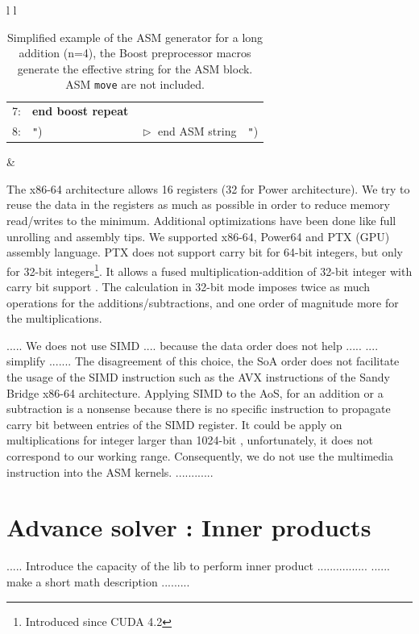 \documentclass[oribibl]{llncs2e/llncs}
\begin{document}
\begin{table}[h]
\begin{center}
\begin{tabular}{l l}
\begin{tabular}{l l l l }
                               \tiny{7:} &  \textbf{end boost repeat} &  &   \\                            
                               \tiny{8:} &  \texttt{"})  &  $\vartriangleright$ end ASM string & \texttt{"})\\
                          \end{tabular} &  \\ \hline
		 \end{tabular} 
		 \caption{Simplified  example of the ASM generator for a long addition (n=4), the Boost preprocessor macros generate the effective string for the ASM block. ASM \texttt{move} are not included. \label{ASMGENERATOR}  }
	\end{center}
\end{table} 

The x86-64 architecture allows 16 registers (32 for Power architecture). We try to reuse the data in the registers as much as possible in order to reduce memory read/writes to the minimum.  Additional optimizations have been done like full unrolling and assembly tips. We  supported  x86-64, Power64 and PTX (GPU) assembly language. PTX does not support carry bit for 64-bit integers, but only for 32-bit integers\footnote{Introduced since CUDA 4.2}.  
It allows a fused multiplication-addition of 32-bit integer  with carry bit support \cite{CUDAasm}.  The calculation in 32-bit mode imposes twice as much operations for the additions/subtractions, and one order of magnitude more for the multiplications. 

..... We does not use SIMD .... because the data order does not help .....
....  simplify .......
The disagreement  of this choice, the SoA order does not facilitate the usage of the SIMD instruction such as the AVX instructions of the Sandy Bridge x86-64 architecture.
Applying SIMD to the AoS, for an addition or a subtraction is a nonsense because there is no specific instruction to propagate carry bit between entries of the SIMD register.
It could be  apply  on multiplications for integer  larger than 1024-bit \cite{SIMD}, unfortunately, it does not correspond to our working range. Consequently, we do not 
use the multimedia instruction into the ASM kernels.
............

\section{Advance solver : Inner products}

..... Introduce the capacity of the lib to perform inner product ................
...... make a short math description ......... 
\end{document}
